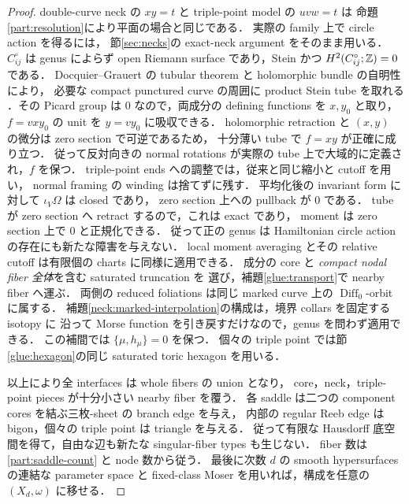 \begin{proof}
double-curve neck の $xy=t$ と triple-point model の $uvw=t$ は
命題\ref{part:resolution}により平面の場合と同じである．
実際の family 上で circle action を得るには，
節\ref{sec:necks}の exact-neck argument をそのまま用いる．
$C_{ij}^{\circ}$ は genus によらず open Riemann surface であり，Stein かつ
$H^2(C_{ij}^{\circ};\mathbb Z)=0$ である．
Docquier--Grauert の tubular theorem と holomorphic bundle の自明性により，
必要な compact punctured curve の周囲に product Stein tube を取れる
\cite{Forstneric}．その Picard group は $0$ なので，両成分の defining functions を
$x,y_0$ と取り，$f=vxy_0$ の unit を $y=vy_0$ に吸収できる．
holomorphic retraction と $(x,y)$ の微分は zero section で可逆であるため，
十分薄い tube で $f=xy$ が正確に成り立つ．
従って反対向きの normal rotations が実際の tube 上で大域的に定義され，$f$ を保つ．
triple-point ends への調整では，従来と同じ縮小と cutoff を用い，
normal framing の winding は捨てずに残す．
平均化後の invariant form に対して $\iota_V\Omega$ は closed であり，
zero section 上への pullback が $0$ である．
tube が zero section へ retract するので，これは exact であり，
moment は zero section 上で $0$ と正規化できる．
従って正の genus は Hamiltonian circle action の存在にも新たな障害を与えない．
local moment averaging とその relative cutoff は有限個の charts に同様に適用できる．
成分の core と \emph{compact nodal fiber 全体}を含む saturated truncation を
選び，補題\ref{glue:transport}で nearby fiber へ運ぶ．
両側の reduced foliations は同じ marked curve 上の
$\operatorname{Diff}_0$-orbit に属する．
補題\ref{neck:marked-interpolation}の構成は，境界 collars を固定する isotopy に
沿って Morse function を引き戻すだけなので，genus を問わず適用できる．
この補間では $\{\mu,h_\mu\}=0$ を保つ．
個々の triple point では節\ref{glue:hexagon}の同じ saturated toric hexagon を用いる．

以上により全 interfaces は whole fibers の union となり，
core，neck，triple-point pieces が十分小さい nearby fiber を覆う．
各 saddle は二つの component cores を結ぶ三枚-sheet の branch edge を与え，
内部の regular Reeb edge は bigon，個々の triple point は triangle を与える．
従って有限な Hausdorff 底空間を得て，自由な辺も新たな singular-fiber types も生じない．
fiber 数は \eqref{part:saddle-count} と node 数から従う．
最後に次数 $d$ の smooth hypersurfaces の連結な parameter space と fixed-class
Moser を用いれば，構成を任意の $(X_d,\omega)$ に移せる．
\end{proof}

